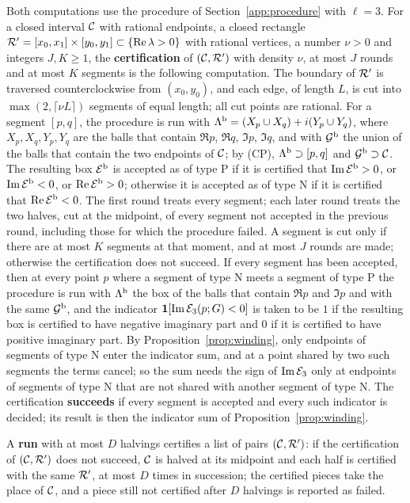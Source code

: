 Both computations use the procedure of Section~\ref{app:procedure} with $\ell=3$.
For a closed interval $\mathcal{C}$ with rational endpoints, a closed rectangle
$\mathcal{R}'=[x_0,x_1]\times[y_0,y_1]\subset\{\Re\lambda>0\}$ with rational vertices, a
number $\nu>0$ and integers $J,K\ge1$, the \textbf{certification} of
$(\mathcal{C},\mathcal{R}')$ with density $\nu$, at most $J$ rounds and at most $K$ segments
is the following computation. The boundary of $\mathcal{R}'$ is traversed
counterclockwise from $(x_0,y_0)$, and each edge, of length $L$, is cut into
$\max(2,\lceil\nu L\rceil)$ segments of equal length; all cut points are rational.
For a segment $[p,q]$, the procedure is run with
$\Lambda^{\rm b}=(X_p\cup X_q)+i(Y_p\cup Y_q)$, where $X_p,X_q,Y_p,Y_q$ are the balls
that contain $\Re p$, $\Re q$, $\Im p$, $\Im q$, and with $\mathcal G^{\rm b}$ the
union of the balls that contain the two endpoints of $\mathcal{C}$; by (CP),
$\Lambda^{\rm b}\supset[p,q]$ and $\mathcal G^{\rm b}\supset\mathcal{C}$. The resulting box
$\mathcal{E}^{\rm b}$ is accepted as of type P if it is certified that
$\Im\mathcal{E}^{\rm b}>0$, or $\Im\mathcal{E}^{\rm b}<0$, or $\Re\mathcal{E}^{\rm b}>0$; otherwise it
is accepted as of type N if it is certified that $\Re\mathcal{E}^{\rm b}<0$. The first
round treats every segment; each later round treats the two halves, cut at the
midpoint, of every segment not accepted in the previous round, including those for
which the procedure failed. A segment is cut only if there are at most $K$
segments at that moment, and at most $J$ rounds are made; otherwise the
certification does not succeed. If every segment has been accepted, then at every
point $p$ where a segment of type N meets a segment of type P the procedure is run
with $\Lambda^{\rm b}$ the box of the balls that contain $\Re p$ and $\Im p$ and
with the same $\mathcal G^{\rm b}$, and the
indicator $\mathbf 1[\Im\mathcal{E}_3(p;G)<0]$ is taken to be $1$ if the resulting box
is certified to have negative imaginary part and $0$ if it is certified to have
positive imaginary part. By Proposition~\ref{prop:winding}, only endpoints of
segments of type N enter the indicator sum, and at a point shared by two such
segments the terms cancel; so the sum needs the sign of $\Im\mathcal{E}_3$ only at
endpoints of segments of type N that are not shared with another segment of
type N. The certification \textbf{succeeds} if every segment is
accepted and every such indicator is decided; its result is then the indicator sum
of Proposition~\ref{prop:winding}.

A \textbf{run} with at most $D$ halvings certifies a list of pairs
$(\mathcal{C},\mathcal{R}')$: if the certification of $(\mathcal{C},\mathcal{R}')$ does not succeed, $\mathcal{C}$
is halved at its midpoint and each half is certified with the same $\mathcal{R}'$, at
most $D$ times in succession; the certified pieces take the place of $\mathcal{C}$, and a
piece still not certified after $D$ halvings is reported as failed.

